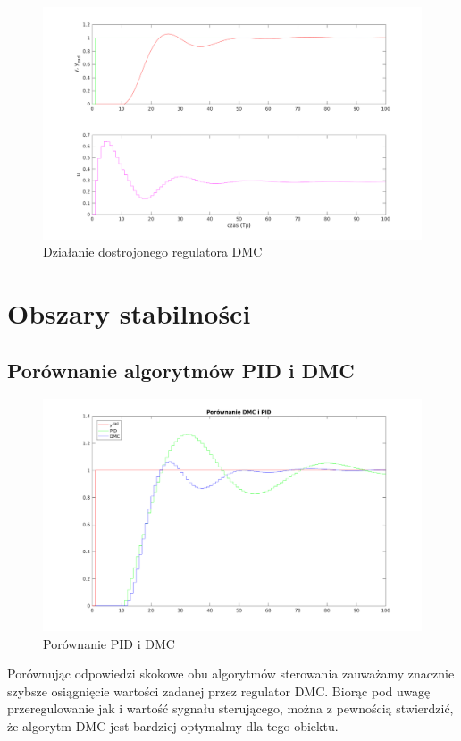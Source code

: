 \documentclass[a4paper, 11pt]{article}
\begin{document}
\begin{figure}[H]
\centering
\includegraphics[scale=0.60]{Dostrojony_DmC.png}
\caption{Działanie dostrojonego regulatora DMC}
\label{}
\end{figure}

\section{Obszary stabilności}
\subsection{Porównanie algorytmów PID i DMC}

\begin{figure}[H]
\centering
\includegraphics[scale=0.60]{PIDiDMC.png}
\caption{Porównanie PID i DMC}
\label{}
\end{figure}

Porównując odpowiedzi skokowe obu algorytmów sterowania zauważamy znacznie szybsze osiągnięcie wartości zadanej przez regulator DMC. Biorąc pod uwagę przeregulowanie jak i wartość sygnału sterującego, można z pewnością stwierdzić, że algorytm DMC jest bardziej optymalmy dla tego obiektu. 
\end{document}
